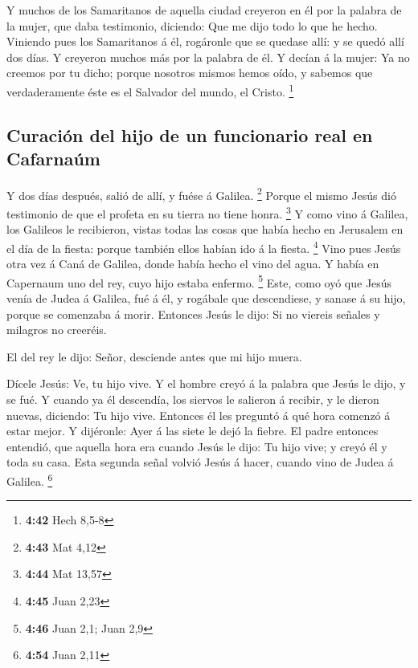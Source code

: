  Y muchos de los Samaritanos de aquella ciudad creyeron
en él por la palabra de la mujer, que daba testimonio, diciendo: Que me
dijo todo lo que he hecho.  Viniendo pues los Samaritanos
á él, rogáronle que se quedase allí: y se quedó allí dos días.
 Y creyeron muchos más por la palabra de él.
 Y decían á la mujer: Ya no creemos por tu dicho; porque
nosotros mismos hemos oído, y sabemos que verdaderamente éste es el
Salvador del mundo, el Cristo. \footnote{\textbf{4:42} Hech 8,5-8}

\hypertarget{curaciuxf3n-del-hijo-de-un-funcionario-real-en-cafarnauxfam}{%
\subsection{Curación del hijo de un funcionario real en
Cafarnaúm}\label{curaciuxf3n-del-hijo-de-un-funcionario-real-en-cafarnauxfam}}

 Y dos días después, salió de allí, y fuése á Galilea.
\footnote{\textbf{4:43} Mat 4,12}  Porque el mismo Jesús
dió testimonio de que el profeta en su tierra no tiene honra.
\footnote{\textbf{4:44} Mat 13,57}  Y como vino á
Galilea, los Galileos le recibieron, vistas todas las cosas que había
hecho en Jerusalem en el día de la fiesta: porque también ellos habían
ido á la fiesta. \footnote{\textbf{4:45} Juan 2,23}  Vino
pues Jesús otra vez á Caná de Galilea, donde había hecho el vino del
agua. Y había en Capernaum uno del rey, cuyo hijo estaba enfermo.
\footnote{\textbf{4:46} Juan 2,1; Juan 2,9}  Este, como
oyó que Jesús venía de Judea á Galilea, fué á él, y rogábale que
descendiese, y sanase á su hijo, porque se comenzaba á morir.
 Entonces Jesús le dijo: Si no viereis señales y milagros
no creeréis.

 El del rey le dijo: Señor, desciende antes que mi hijo
muera.

 Dícele Jesús: Ve, tu hijo vive. Y el hombre creyó á la
palabra que Jesús le dijo, y se fué.  Y cuando ya él
descendía, los siervos le salieron á recibir, y le dieron nuevas,
diciendo: Tu hijo vive.  Entonces él les preguntó á qué
hora comenzó á estar mejor. Y dijéronle: Ayer á las siete le dejó la
fiebre.  El padre entonces entendió, que aquella hora era
cuando Jesús le dijo: Tu hijo vive; y creyó él y toda su casa.
 Esta segunda señal volvió Jesús á hacer, cuando vino de
Judea á Galilea. \footnote{\textbf{4:54} Juan 2,11}

